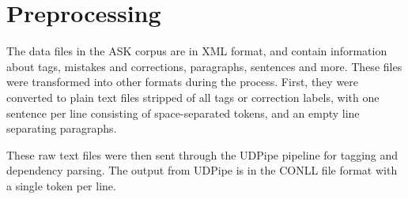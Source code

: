 
\section{Preprocessing}

The data files in the ASK corpus are in XML format, and contain information
about tags, mistakes and corrections, paragraphs, sentences and more. These
files were transformed into other formats during the process. First, they were
converted to plain text files stripped of all tags or correction labels, with
one sentence per line consisting of space-separated tokens, and an empty line
separating paragraphs.

These raw text files were then sent through the UDPipe pipeline for tagging and
dependency parsing. The output from UDPipe is in the CONLL file format with
a single token per line.
